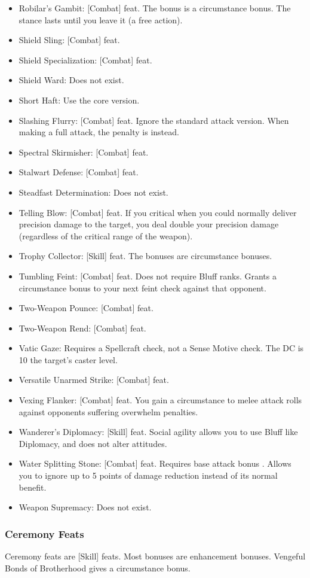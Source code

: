 \begin{itemize}
\item Robilar's Gambit: [Combat] feat. The bonus is a circumstance bonus. The stance lasts until you leave it (a free action).
\item Shield Sling: [Combat] feat.
\item Shield Specialization: [Combat] feat.
\item Shield Ward: Does not exist.
\item Short Haft: Use the core version.
\item Slashing Flurry: [Combat] feat. Ignore the standard attack version. When making a full attack, the penalty is  instead.
\item Spectral Skirmisher: [Combat] feat.
\item Stalwart Defense: [Combat] feat.
\item Steadfast Determination: Does not exist.
\item Telling Blow: [Combat] feat. If you critical when you could normally deliver precision damage to the target, you deal double your precision damage (regardless of the critical range of the weapon).
\item Trophy Collector: [Skill] feat. The bonuses are circumstance bonuses.
\item Tumbling Feint: [Combat] feat. Does not require Bluff ranks. Grants a  circumstance bonus to your next feint check against that opponent.
\item Two-Weapon Pounce: [Combat] feat.
\item Two-Weapon Rend: [Combat] feat.
\item Vatic Gaze: Requires a Spellcraft check, not a Sense Motive check. The DC is 10 \add the target's caster level.
\item Versatile Unarmed Strike: [Combat] feat.
\item Vexing Flanker: [Combat] feat. You gain a  circumstance to melee attack rolls against opponents suffering overwhelm penalties.
\item Wanderer's Diplomacy: [Skill] feat. Social agility allows you to use Bluff like Diplomacy, and does not alter attitudes.
\item Water Splitting Stone: [Combat] feat. Requires base attack bonus . Allows you to ignore up to 5 points of damage reduction instead of its normal benefit.
\item Weapon Supremacy: Does not exist.
\end{itemize}
\subsubsection{Ceremony Feats}
Ceremony feats are [Skill] feats. Most bonuses are enhancement bonuses. Vengeful Bonds of Brotherhood gives a circumstance bonus.
